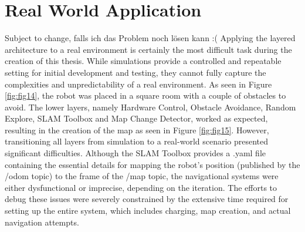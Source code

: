 \documentclass[%
paper=A4,               %
twoside=true,           %
openright,              %
11pt,                   %
bibliography=totoc,     %
titlepage=on,           %
DIV=12,                 %
BCOR=1.5cm,             %
parskip=half,            %
final
]{scrreprt}
\begin{document}
	\section{Real World Application} 
	{\color{red} Subject to change, falls ich das Problem noch lösen kann :( }
	Applying the layered architecture to a real environment is certainly the most difficult task during the creation of this thesis. While simulations provide a controlled and repeatable setting for initial development and testing, they cannot fully capture the complexities and unpredictability of a real environment. As seen in Figure \ref{fig:fig14}, the robot was placed in a square room with a couple of obstacles to avoid. The lower layers, namely Hardware Control, Obstacle Avoidance, Random Explore, SLAM Toolbox and Map Change Detector, worked as expected, resulting in the creation of the map as seen in Figure \ref{fig:fig15}. However, transitioning all layers from simulation to a real-world scenario presented significant difficulties. Although the SLAM Toolbox provides a .yaml file containing the essential details for mapping the robot's position (published by the /odom topic) to the frame of the /map topic, the navigational systems were either dysfunctional or imprecise, depending on the iteration. The efforts to debug these issues were severely constrained by the extensive time required for setting up the entire system, which includes charging, map creation, and actual navigation attempts.
	
\end{document}
